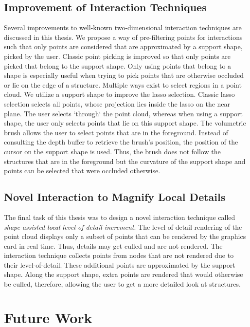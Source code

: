 \subsection*{Improvement of Interaction Techniques}

Several improvements to well-known two-dimensional interaction techniques are discussed in this thesis. We propose a way of pre-filtering points for interactions such that only points are considered that are approximated by a support shape, picked by the user. Classic point picking is improved so that only points are picked that belong to the support shape. Only using points that belong to a shape is especially useful when trying to pick points that are otherwise occluded or lie on the edge of a structure. Multiple ways exist to select regions in a point cloud. We utilize a support shape to improve the lasso selection. Classic lasso selection selects all points, whose projection lies inside the lasso on the near plane. The user selects `through` the point cloud, whereas when using a support shape, the user only selects points that lie on this support shape. The volumetric brush allows the user to select points that are in the foreground. Instead of consulting the depth buffer to retrieve the brush's position, the position of the cursor on the support shape is used. Thus, the brush does not follow the structures that are in the foreground but the curvature of the support shape and points can be selected that were occluded otherwise. 


\subsection*{Novel Interaction to Magnify Local Details}

The final task of this thesis was to design a novel interaction technique called \textit{shape-assisted local level-of-detail increment}. The level-of-detail rendering of the point cloud displays only a subset of points that can be rendered by the graphics card in real time. Thus, details may get culled and are not rendered. The interaction technique collects points from nodes that are not rendered due to their level-of-detail. These additional points are approximated by the support shape. Along the support shape, extra points are rendered that would otherwise be culled, therefore, allowing the user to get a more detailed look at structures. 


\section{Future Work}

